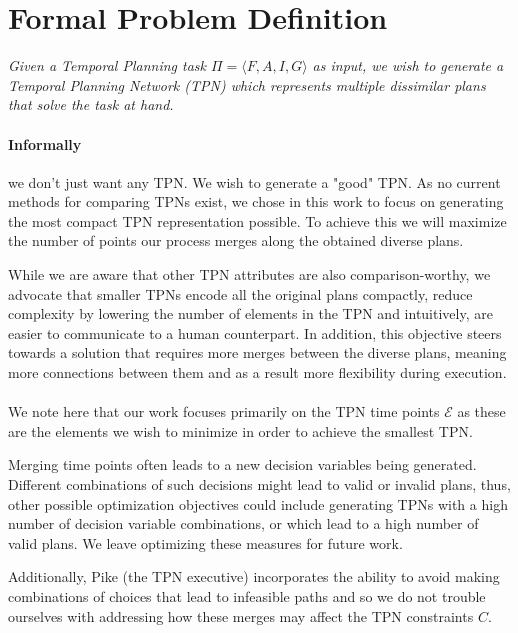 \section{Formal Problem Definition}
\label{generating: formal prob def}


\begin{tcolorbox}[colback=gray!5!white,colframe=gray!75!black]
\textit{Given a Temporal Planning task $\Pi = \langle F,A,I,G \rangle $ as input, we wish to generate a Temporal Planning Network (TPN) which represents multiple dissimilar plans that solve the task at hand.}
\end{tcolorbox}


\paragraph{Informally} we don't just want any TPN. We wish to generate a "good" TPN. 
As no current methods for comparing TPNs exist, we chose in this work to focus on generating 
the most compact TPN representation possible. To achieve this we will maximize the number of 
points our process merges along the obtained diverse plans.

While we are aware that other TPN attributes are also comparison-worthy, we advocate that smaller TPNs encode all the original plans compactly, reduce complexity by lowering the number of elements in the TPN and intuitively, are easier to communicate to a human counterpart. In addition, this objective steers towards a solution that requires more merges between the diverse plans, meaning more connections between them and as a result more flexibility during execution.

\paragraph{}
We note here that our work focuses primarily on the TPN time points $\mathcal{E}$ as these are the elements we wish to minimize in order to achieve the smallest TPN.

Merging time points often leads to a new decision variables being generated. Different combinations of such decisions might lead to valid or invalid plans, thus, other possible optimization objectives could include generating TPNs with a high number of decision variable combinations, or which lead to a high number of valid plans. We leave optimizing these measures for future work.

Additionally, Pike (the TPN executive) incorporates the ability to avoid making combinations of choices that lead to infeasible paths and so we do not trouble ourselves with addressing how these merges may affect the TPN constraints $C$.